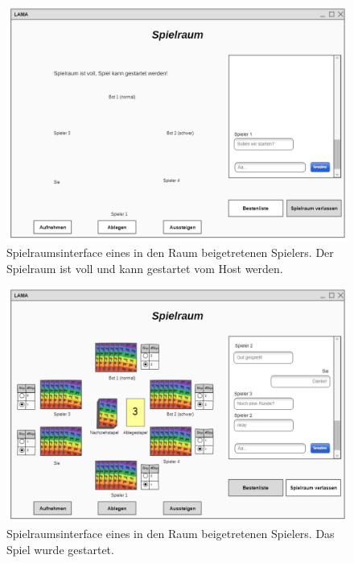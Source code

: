 \begin{figure}[h]
	\centering
	\includegraphics[width=\textwidth]{img/spielstartenbeigetretenerspielerv3.png}
	\caption{Spielraumsinterface eines in den Raum beigetretenen Spielers. Der Spielraum ist voll und kann gestartet vom Host werden.}
	\label{gui:spielraumstarten_s} 
\end{figure}

\begin{figure}[h]
	\centering
	\includegraphics[width=\textwidth]{img/spielgestartetbeigetretenerspielerv3.png}
	\caption{Spielraumsinterface eines in den Raum beigetretenen Spielers. Das Spiel wurde gestartet.}
	\label{gui:spielraumgestartet_s} 
\end{figure}

